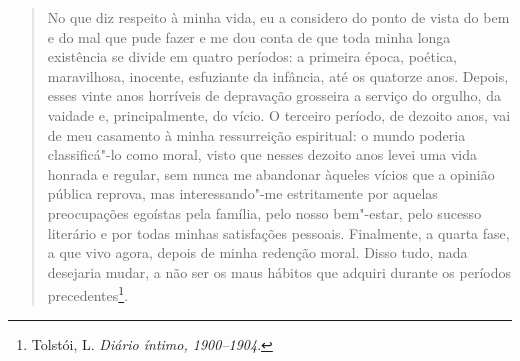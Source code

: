 \begin{quote}
No que diz respeito à minha vida, eu a considero do ponto de vista do
bem e do mal que pude fazer e me dou conta de que toda minha longa
existência se divide em quatro períodos: a primeira época, poética,
maravilhosa, inocente, esfuziante da infância, até os quatorze anos.
Depois, esses vinte anos horríveis de depravação grosseira a serviço do
orgulho, da vaidade e, principalmente, do vício. O terceiro período, de
dezoito anos, vai de meu casamento à minha ressurreição espiritual: o
mundo poderia classificá"-lo como moral, visto que nesses dezoito anos
levei uma vida honrada e regular, sem nunca me abandonar àqueles vícios
que a opinião pública reprova, mas interessando"-me estritamente por
aquelas preocupações egoístas pela família, pelo nosso bem"-estar, pelo
sucesso literário e por todas minhas satisfações pessoais. Finalmente,
a quarta fase, a que vivo agora, depois de minha redenção moral. Disso
tudo, nada desejaria mudar, a não ser os maus hábitos que adquiri
durante os períodos precedentes\footnote{Tolstói, L. \emph{Diário íntimo, 1900--1904}.}.
\end{quote}


